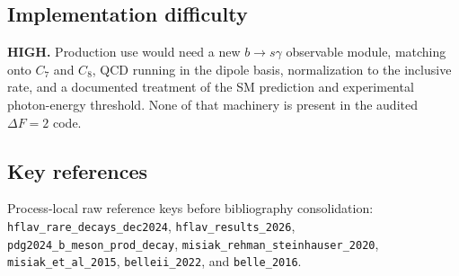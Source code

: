 \subsection*{Implementation difficulty}
\textbf{HIGH.}  Production use would need a new \(b\to s\gamma\) observable module,
matching onto \(C_7\) and \(C_8\), QCD running in the dipole basis,
normalization to the inclusive rate, and a documented treatment of the SM
prediction and experimental photon-energy threshold.  None of that machinery
is present in the audited \(\Delta F=2\) code.

\subsection*{Key references}
Process-local raw reference keys before bibliography consolidation:
\texttt{hflav\_rare\_decays\_dec2024},
\texttt{hflav\_results\_2026},
\texttt{pdg2024\_b\_meson\_prod\_decay},
\texttt{misiak\_rehman\_steinhauser\_2020},
\texttt{misiak\_et\_al\_2015},
\texttt{belleii\_2022}, and \texttt{belle\_2016}.
